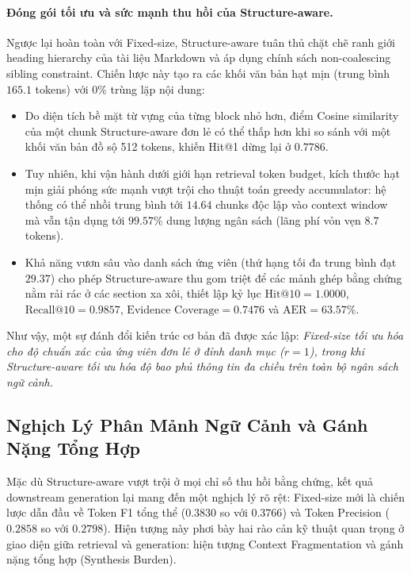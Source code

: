 \paragraph{Đóng gói tối ưu và sức mạnh thu hồi của Structure-aware.}
Ngược lại hoàn toàn với Fixed-size, Structure-aware tuân thủ chặt chẽ ranh giới heading hierarchy của tài liệu Markdown và áp dụng chính sách non-coalescing sibling constraint. Chiến lược này tạo ra các khối văn bản hạt mịn (trung bình $165.1$ tokens) với $0\%$ trùng lặp nội dung:
\begin{itemize}
    \item Do diện tích bề mặt từ vựng của từng block nhỏ hơn, điểm Cosine similarity của một chunk Structure-aware đơn lẻ có thể thấp hơn khi so sánh với một khối văn bản đồ sộ 512 tokens, khiến Hit@1 dừng lại ở $0.7786$.
    \item Tuy nhiên, khi vận hành dưới giới hạn retrieval token budget, kích thước hạt mịn giải phóng sức mạnh vượt trội cho thuật toán greedy accumulator: hệ thống có thể nhồi trung bình tới $14.64$ chunks độc lập vào context window mà vẫn tận dụng tới $99.57\%$ dung lượng ngân sách (lãng phí vỏn vẹn $8.7$ tokens).
    \item Khả năng vươn sâu vào danh sách ứng viên (thứ hạng tối đa trung bình đạt $29.37$) cho phép Structure-aware thu gom triệt để các mảnh ghép bằng chứng nằm rải rác ở các section xa xôi, thiết lập kỷ lục $\text{Hit@10} = 1.0000$, $\text{Recall@10} = 0.9857$, $\text{Evidence Coverage} = 0.7476$ và $\text{AER} = 63.57\%$.
\end{itemize}
Như vậy, một sự đánh đổi kiến trúc cơ bản đã được xác lập: \textit{Fixed-size tối ưu hóa cho độ chuẩn xác của ứng viên đơn lẻ ở đỉnh danh mục ($r=1$), trong khi Structure-aware tối ưu hóa độ bao phủ thông tin đa chiều trên toàn bộ ngân sách ngữ cảnh.}

\subsection{Nghịch Lý Phân Mảnh Ngữ Cảnh và Gánh Nặng Tổng Hợp}
\label{subsec:context_fragmentation_synthesis_burden}

Mặc dù Structure-aware vượt trội ở mọi chỉ số thu hồi bằng chứng, kết quả downstream generation lại mang đến một nghịch lý rõ rệt: Fixed-size mới là chiến lược dẫn đầu về Token F1 tổng thể ($0.3830$ so với $0.3766$) và Token Precision ($0.2858$ so với $0.2798$). Hiện tượng này phơi bày hai rào cản kỹ thuật quan trọng ở giao diện giữa retrieval và generation: hiện tượng Context Fragmentation và gánh nặng tổng hợp (Synthesis Burden).


